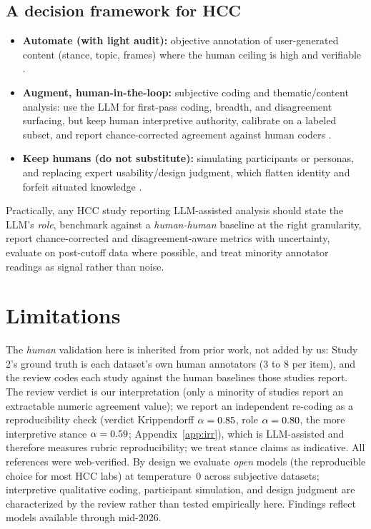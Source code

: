 \subsection{A decision framework for HCC}
\begin{itemize}[leftmargin=1.4em,itemsep=2pt]
\item \textbf{Automate (with light audit):} objective annotation of user-generated content (stance, topic, frames)
where the human ceiling is high and verifiable \citep{gilardi2023chatgpt,tornberg2023political}.
\item \textbf{Augment, human-in-the-loop:} subjective coding and thematic/content analysis: use the LLM for
first-pass coding, breadth, and disagreement surfacing, but keep human interpretive authority, calibrate on a
labeled subset, and report chance-corrected agreement against human coders \citep{gao2024collabcoder,dai2023llminloop}.
\item \textbf{Keep humans (do not substitute):} simulating participants or personas, and replacing expert
usability/design judgment, which flatten identity and forfeit situated knowledge
\citep{wang2024flatten,guerino2025gpt4ousability,salminen2025syntheticcritical}.
\end{itemize}
Practically, any HCC study reporting LLM-assisted analysis should state the LLM's \emph{role}, benchmark against a
\emph{human-human} baseline at the right granularity, report chance-corrected and disagreement-aware metrics with
uncertainty, evaluate on post-cutoff data where possible, and treat minority annotator readings as signal rather
than noise.
\section{Limitations}
The \emph{human} validation here is inherited from prior work, not added by us: Study 2's ground truth is each
dataset's own human annotators (3 to 8 per item), and the review codes each study against the human baselines those
studies report. The review verdict is our interpretation (only a minority of studies report an extractable numeric
agreement value); we report an independent re-coding as a reproducibility check (verdict Krippendorff
$\alpha=0.85$, role $\alpha=0.80$, the more interpretive stance $\alpha=0.59$;
Appendix~\ref{app:irr}), which is LLM-assisted and therefore measures rubric reproducibility; we treat stance claims
as indicative. All references were web-verified. By design we evaluate \emph{open} models (the reproducible choice
for most HCC labs) at temperature~0 across \SOCndat{} subjective datasets; interpretive qualitative coding,
participant simulation, and design judgment are characterized by the review rather than tested empirically here.
Findings reflect models available through mid-2026.
